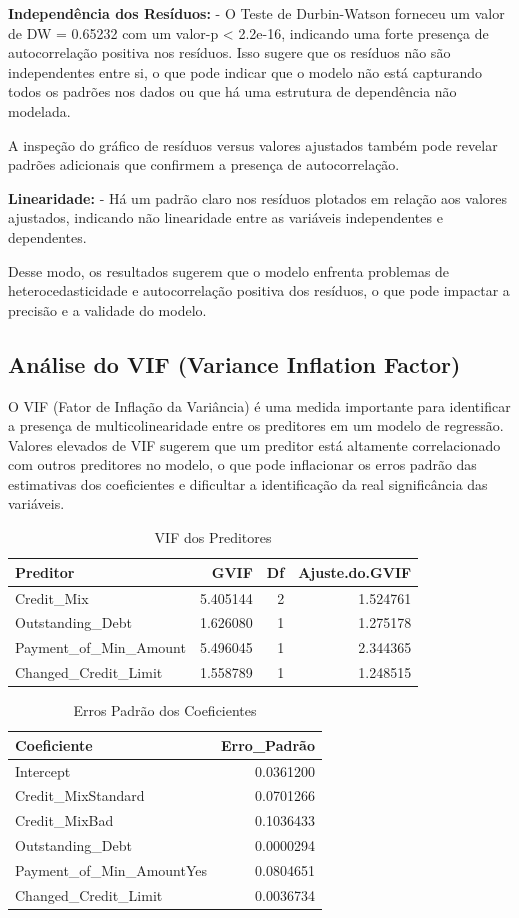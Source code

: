 \documentclass[
  letterpaper,
  DIV=11,
  numbers=noendperiod]{scrreprt}
\begin{document}
\textbf{Independência dos Resíduos:} - O Teste de Durbin-Watson forneceu
um valor de DW = 0.65232 com um valor-p \textless{} 2.2e-16, indicando
uma forte presença de autocorrelação positiva nos resíduos. Isso sugere
que os resíduos não são independentes entre si, o que pode indicar que o
modelo não está capturando todos os padrões nos dados ou que há uma
estrutura de dependência não modelada.

A inspeção do gráfico de resíduos versus valores ajustados também pode
revelar padrões adicionais que confirmem a presença de autocorrelação.

\textbf{Linearidade:} - Há um padrão claro nos resíduos plotados em
relação aos valores ajustados, indicando não linearidade entre as
variáveis independentes e dependentes.

Desse modo, os resultados sugerem que o modelo enfrenta problemas de
heterocedasticidade e autocorrelação positiva dos resíduos, o que pode
impactar a precisão e a validade do modelo.

\subsection{Análise do VIF (Variance Inflation
Factor)}\label{anuxe1lise-do-vif-variance-inflation-factor}

O VIF (Fator de Inflação da Variância) é uma medida importante para
identificar a presença de multicolinearidade entre os preditores em um
modelo de regressão. Valores elevados de VIF sugerem que um preditor
está altamente correlacionado com outros preditores no modelo, o que
pode inflacionar os erros padrão das estimativas dos coeficientes e
dificultar a identificação da real significância das variáveis.

\begin{longtable}[t]{lrrr}
\caption{\label{tab:unnamed-chunk-41}VIF dos Preditores}\\
\toprule
Preditor & GVIF & Df & Ajuste.do.GVIF\\
\midrule
Credit\_Mix & 5.405144 & 2 & 1.524761\\
Outstanding\_Debt & 1.626080 & 1 & 1.275178\\
Payment\_of\_Min\_Amount & 5.496045 & 1 & 2.344365\\
Changed\_Credit\_Limit & 1.558789 & 1 & 1.248515\\
\bottomrule
\end{longtable}

\begin{longtable}[t]{lr}
\caption{\label{tab:unnamed-chunk-42}Erros Padrão dos Coeficientes}\\
\toprule
Coeficiente & Erro\_Padrão\\
\midrule
Intercept & 0.0361200\\
Credit\_MixStandard & 0.0701266\\
Credit\_MixBad & 0.1036433\\
Outstanding\_Debt & 0.0000294\\
Payment\_of\_Min\_AmountYes & 0.0804651\\
\addlinespace
Changed\_Credit\_Limit & 0.0036734\\
\bottomrule
\end{longtable}
\end{document}
